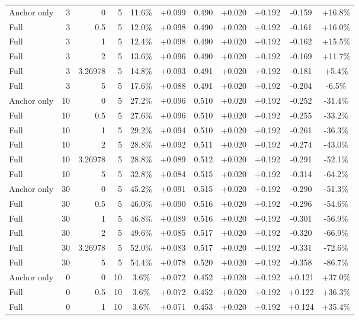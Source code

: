 \begin{table}[htbp]
\begin{tabular}{lrrrccccccc}
Anchor only & 3 & 0 & 5 & 11.6\% & +0.099 & 0.490 & +0.020 & +0.192 & -0.159 & +16.8\% \\
Full & 3 & 0.5 & 5 & 12.0\% & +0.098 & 0.490 & +0.020 & +0.192 & -0.161 & +16.0\% \\
Full & 3 & 1 & 5 & 12.4\% & +0.098 & 0.490 & +0.020 & +0.192 & -0.162 & +15.5\% \\
Full & 3 & 2 & 5 & 13.6\% & +0.096 & 0.490 & +0.020 & +0.192 & -0.169 & +11.7\% \\
Full & 3 & 3.26978 & 5 & 14.8\% & +0.093 & 0.491 & +0.020 & +0.192 & -0.181 & +5.4\% \\
Full & 3 & 5 & 5 & 17.6\% & +0.088 & 0.491 & +0.020 & +0.192 & -0.204 & -6.5\% \\
Anchor only & 10 & 0 & 5 & 27.2\% & +0.096 & 0.510 & +0.020 & +0.192 & -0.252 & -31.4\% \\
Full & 10 & 0.5 & 5 & 27.6\% & +0.096 & 0.510 & +0.020 & +0.192 & -0.255 & -33.2\% \\
Full & 10 & 1 & 5 & 29.2\% & +0.094 & 0.510 & +0.020 & +0.192 & -0.261 & -36.3\% \\
Full & 10 & 2 & 5 & 28.8\% & +0.092 & 0.511 & +0.020 & +0.192 & -0.274 & -43.0\% \\
Full & 10 & 3.26978 & 5 & 28.8\% & +0.089 & 0.512 & +0.020 & +0.192 & -0.291 & -52.1\% \\
Full & 10 & 5 & 5 & 32.8\% & +0.084 & 0.515 & +0.020 & +0.192 & -0.314 & -64.2\% \\
Anchor only & 30 & 0 & 5 & 45.2\% & +0.091 & 0.515 & +0.020 & +0.192 & -0.290 & -51.3\% \\
Full & 30 & 0.5 & 5 & 46.0\% & +0.090 & 0.516 & +0.020 & +0.192 & -0.296 & -54.6\% \\
Full & 30 & 1 & 5 & 46.8\% & +0.089 & 0.516 & +0.020 & +0.192 & -0.301 & -56.9\% \\
Full & 30 & 2 & 5 & 49.6\% & +0.085 & 0.517 & +0.020 & +0.192 & -0.320 & -66.9\% \\
Full & 30 & 3.26978 & 5 & 52.0\% & +0.083 & 0.517 & +0.020 & +0.192 & -0.331 & -72.6\% \\
Full & 30 & 5 & 5 & 54.4\% & +0.078 & 0.520 & +0.020 & +0.192 & -0.358 & -86.7\% \\
Anchor only & 0 & 0 & 10 & 3.6\% & +0.072 & 0.452 & +0.020 & +0.192 & +0.121 & +37.0\% \\
Full & 0 & 0.5 & 10 & 3.6\% & +0.072 & 0.452 & +0.020 & +0.192 & +0.122 & +36.3\% \\
Full & 0 & 1 & 10 & 3.6\% & +0.071 & 0.453 & +0.020 & +0.192 & +0.124 & +35.4\% \\

\end{tabular}
\end{table}
